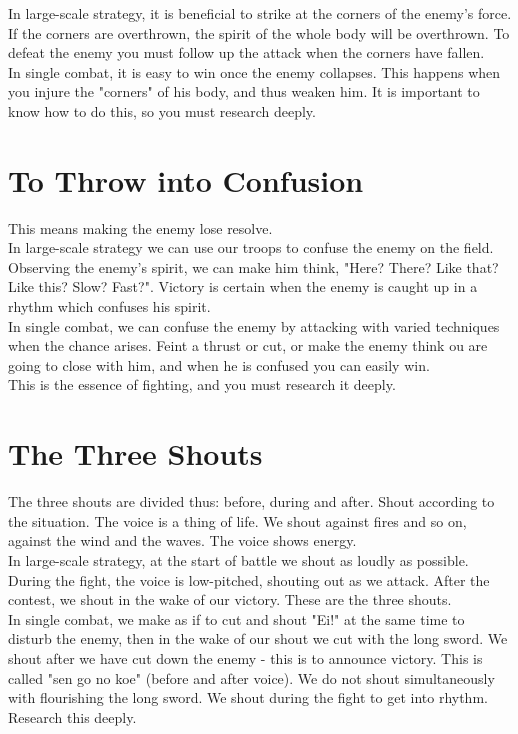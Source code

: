 In large-scale strategy, it is beneficial to strike at the corners of the enemy's force. If the corners are overthrown, the spirit of the whole body will be overthrown. To defeat the enemy you must follow up the attack when the corners have fallen.\\

In single combat, it is easy to win once the enemy collapses. This happens when you injure the "corners" of his body, and thus weaken him. It is important to know how to do this, so you must research deeply.\\
\section{To Throw into Confusion}

This means making the enemy lose resolve.\\

In large-scale strategy we can use our troops to confuse the enemy on the field. Observing the enemy's spirit, we can make him think, "Here? There? Like that? Like this? Slow? Fast?". Victory is certain when the enemy is caught up in a rhythm which confuses his spirit.\\

In single combat, we can confuse the enemy by attacking with varied techniques when the chance arises. Feint a thrust or cut, or make the enemy think ou are going to close with him, and when he is confused you can easily win.\\

This is the essence of fighting, and you must research it deeply.\\
\section{The Three Shouts}

The three shouts are divided thus: before, during and after. Shout according to the situation. The voice is a thing of life. We shout against fires and so on, against the wind and the waves. The voice shows energy.\\

In large-scale strategy, at the start of battle we shout as loudly as possible. During the fight, the voice is low-pitched, shouting out as we attack. After the contest, we shout in the wake of our victory. These are the three shouts.\\

In single combat, we make as if to cut and shout "Ei!" at the same time to disturb the enemy, then in the wake of our shout we cut with the long sword. We shout after we have cut down the enemy - this is to announce victory. This is called "sen go no koe" (before and after voice). We do not shout simultaneously with flourishing the long sword. We shout during the fight to get into rhythm. Research this deeply.\\
